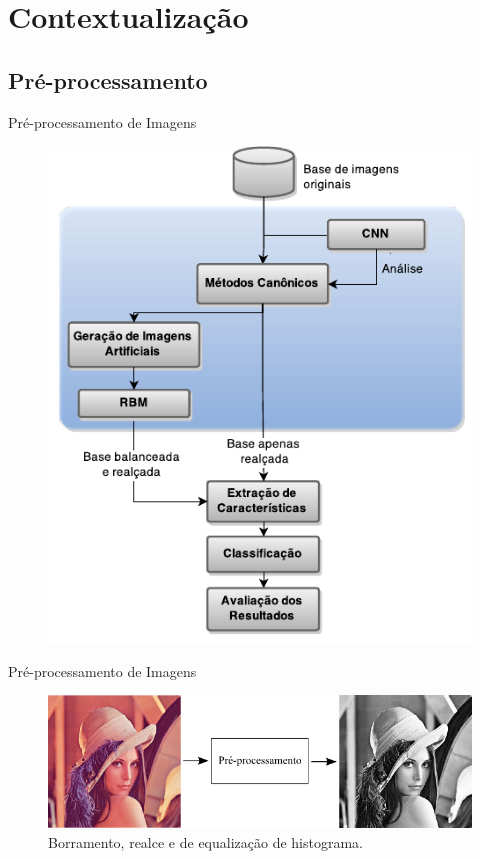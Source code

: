 \documentclass{beamer}
\begin{document}
\section{Contextualização}
\subsection{Pré-processamento}
\begin{frame}{Pré-processamento de Imagens}
\begin{figure}
    \includegraphics[height=0.75\textheight]{figuras/geral.pdf}
\end{figure}
\end{frame}
\begin{frame}{Pré-processamento de Imagens}
\begin{figure}[htbp]
 \begin{center}
   \includegraphics[width=1\linewidth]{figuras/preprocessamento.png}
 \caption{Borramento, realce e de equalização de histograma.}
 \end{center}
\end{figure}
\end{frame}
\end{document}
